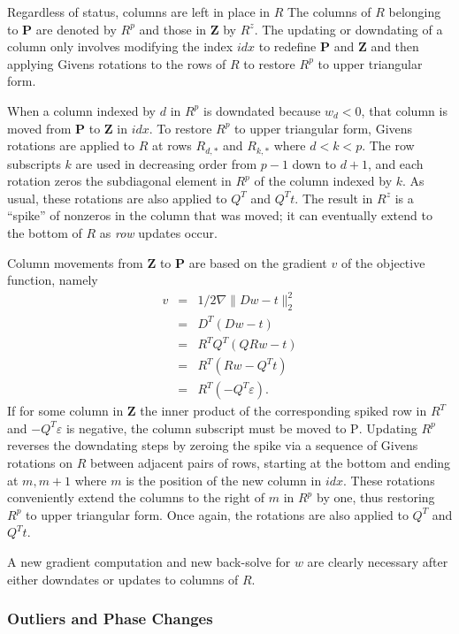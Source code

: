 Regardless of status, columns are left in place in $R$
The columns of $R$ belonging to \textbf{P} are denoted by $R^p$ and those in \textbf{Z} by $R^z$.
The updating or downdating of a column only involves modifying the index $idx$ to redefine \textbf{P} and \textbf{Z} and then
applying Givens rotations to the rows of $R$ to restore $R^p$ to upper triangular form.

When a column indexed by $d$ in $R^p$ is downdated because $w_d < 0$, that column is moved from \textbf{P} to \textbf{Z} in $idx$.
To restore $R^p$ to upper triangular form, Givens rotations are applied to $R$ at rows $R_{d,*}$ and $R_{k,*}$
where $d < k < p$. The row subscripts $k$ are used in decreasing order from $p-1$ down to $d+1$,
and each rotation zeros the subdiagonal element in $R^p$ of the column indexed by $k$.
As usual, these rotations are also applied to $Q^T$ and $Q^Tt$.
The result in $R^z$ is a ``spike'' of nonzeros in the column that was moved;
it can eventually extend to the bottom of $R$ as \emph{row} updates occur.

Column movements from \textbf{Z} to \textbf{P} are based on the gradient $v$ of the objective function, namely
\begin{eqnarray*}
v &=& 1/2\nabla\|Dw - t\|^2_2 \\
  &=& D^T(Dw - t)             \\
  &=& R^TQ^T(QRw - t)         \\
  &=& R^T(Rw - Q^Tt)          \\
  &=& R^T(-Q^T\varepsilon).
\end{eqnarray*}
If for some column in \textbf{Z} the inner product of the corresponding spiked row in $R^T$ and $-Q^T\varepsilon$ is negative,
the column subscript must be moved to \textsc{P}.
Updating $R^p$ reverses the downdating steps by zeroing the spike via a sequence of Givens rotations on $R$
between adjacent pairs of rows, starting at the bottom and ending at $m,m+1$ where $m$ is the position of the new column in $idx$.
These rotations conveniently extend the columns to the right of $m$ in $R^p$ by one,
thus restoring $R^p$ to upper triangular form. Once again, the rotations are also applied to $Q^T$ and $Q^Tt$.

A new gradient computation and new back-solve for $w$ are clearly necessary after either downdates or updates to columns of $R$.




\subsubsection*{Outliers and Phase Changes}


